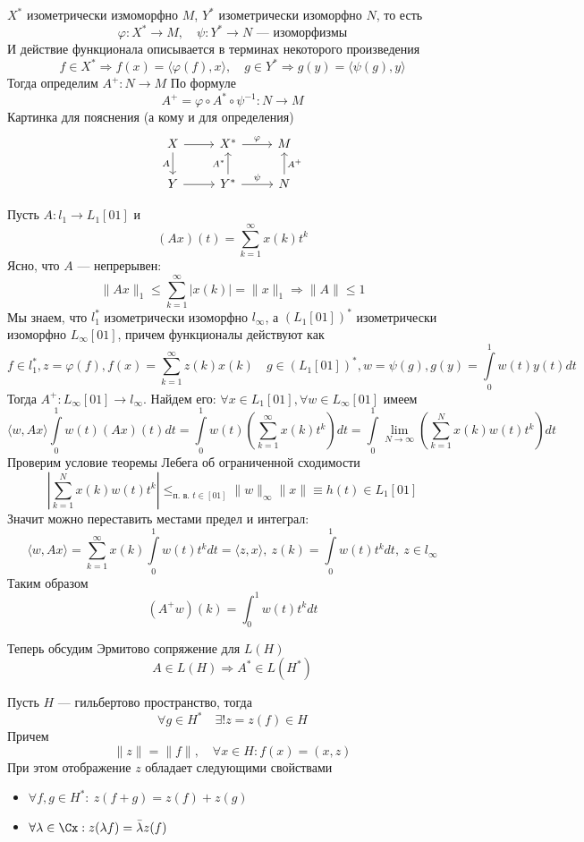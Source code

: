  $X^*$ изометрически измоморфно $M$, $Y^*$ изометрически изоморфно $N$, то есть
$$
\varphi\colon X^* \to M, \quad \psi\colon Y^* \to N \text{ --- изоморфизмы} 
$$
И действие функционала описывается в терминах некоторого произведения
$$
f \in X^* \Rightarrow f(x) = \langle \varphi(f), x\rangle, \quad g \in Y^* \Rightarrow g(y) = \langle \psi(g), y\rangle
$$
Тогда определим $A^+ \colon N \to M$ По формуле $$
A^+ = \varphi \circ A^* \circ \psi^{-1}\colon N \to M
$$ 
Картинка для пояснения (а кому и для определения)
\[\begin{tikzcd}[ampersand replacement=\&]
	X \& {X^*} \& M \\
	Y \& {Y^*} \& N
	\arrow[from=1-1, to=1-2]
	\arrow["\varphi", from=1-2, to=1-3]
	\arrow[from=2-1, to=2-2]
	\arrow["\psi", from=2-2, to=2-3]
	\arrow["A"', from=1-1, to=2-1]
	\arrow["{A^+}"', from=2-3, to=1-3]
	\arrow["{A^*}", from=2-2, to=1-2]
\end{tikzcd}\]
\begin{example}
	Пусть $A\colon l_1 \to L_1[01]$ и 
	$$
	(Ax)(t) = \sum_{k=1}^{\infty} x(k)t^k
	$$
	Ясно, что $A$ --- непрерывен:
	$$
	\|Ax\|_1 \leq \sum_{k=1}^\infty |x(k)| = \|x\|_1 \Rightarrow \|A\| \leq 1
	$$
	Мы знаем, что $l_1^*$ изометрически изоморфно $l_\infty$, а $(L_1[01])^*$ изометрически изоморфно $L_\infty[01]$, причем функционалы действуют как 
	$$
	f \in l_1^{*},   z = \varphi(f),   f(x) = \sum_{k=1}^\infty z(k)x(k) \quad g \in  (L_1[01])^*,  w = \psi(g), g(y) = \int\limits_{0}^1 w(t)y(t)dt
	$$
	Тогда $A^+: L_\infty[01] \to l_\infty$. Найдем его:
	$
	\forall x \in L_1[01], \forall w \in L_\infty[01]
	$ имеем
	$$
	\langle w, Ax \rangle \int\limits_{0}^1 w(t)(Ax)(t)dt =  \int\limits_{0}^1 w(t) \left(
	\sum_{k=1}^\infty x(k) t^k\right)dt =  \int\limits_{0}^1 \lim\limits_{N \to \infty}\left(\sum_{k=1}^N x(k)w(t)t^k\right)dt
	$$
	Проверим условие теоремы Лебега об ограниченной сходимости
	$$
	\left|\sum_{k=1}^N x(k)w(t)t^k\right| \leq_{\text{п. в. $t\in[01]$}} \|w\|_\infty\|x\| \equiv h(t) \in L_1[01]
	$$
	Значит можно переставить местами предел и интеграл:
	$$
	\langle w, Ax \rangle = \sum_{k=1}^\infty x(k)\int\limits_{0}^1 w(t) t^k dt = \langle z, x\rangle, \ z(k) = \int\limits_{0}^1  w(t)t^k dt, \ z \in l_\infty
	$$
	Таким образом 
	$$
	(A^+ w)(k) = \int_{0}^{1}w(t)t^k dt
	$$
\end{example}
Теперь обсудим Эрмитово сопряжение для $L(H)$
$$
A \in L(H) \Rightarrow A^* \in L (H^*)
$$
\begin{theorem}
	Пусть $H$ --- гильбертово пространство, тогда $$\forall g \in H^* \quad  \exists! z = z(f) \in H$$ Причем $$\|z\| = \|f\|, \quad \forall x \in H\colon f(x) = (x,z) $$
	При этом отображение $z$ обладает следующими свойствами
	\begin{itemize}
		\item $\forall f,g \in H^*: \ z(f + g) = z(f) + z(g)$
		\item $\forall \lambda \in \Cx: z(\lambda f) = \bar{\lambda} z(f)$
	\end{itemize}
\end{theorem}

